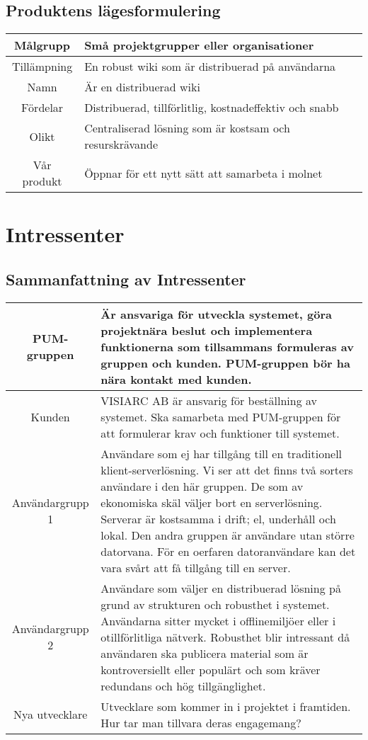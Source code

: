 \subsection{Produktens lägesformulering} %
\begin{tabular}{|c|m{15 cm}|}
\hline
Målgrupp & Små projektgrupper eller organisationer\\
\hline
Tillämpning & En robust wiki som är distribuerad på användarna \\
\hline
Namn & Är en distribuerad wiki  \\
\hline 
Fördelar & Distribuerad, tillförlitlig, kostnadeffektiv och snabb \\
\hline
Olikt & Centraliserad lösning som är kostsam och resurskrävande \\
\hline
Vår produkt & Öppnar för ett nytt sätt att samarbeta i molnet \\
\hline
\end{tabular}
\section{Intressenter}
\subsection{Sammanfattning av Intressenter}
\begin{tabular}{|c|m{14 cm}|}
 \hline
PUM-gruppen & Är ansvariga för utveckla systemet, göra projektnära beslut och implementera funktionerna som tillsammans formuleras av gruppen och kunden.  PUM-gruppen bör ha nära kontakt med kunden. \\ \hline
Kunden & VISIARC AB är ansvarig för beställning av systemet. Ska samarbeta med PUM-gruppen för att formulerar krav och funktioner till systemet. \\ \hline
Användargrupp 1 & Användare som ej har tillgång till en traditionell klient-serverlösning. Vi ser att det finns två sorters användare i den här gruppen. De som av ekonomiska skäl väljer bort en serverlösning. Serverar är kostsamma i drift; el, underhåll och lokal. Den andra gruppen är användare utan större datorvana. För en oerfaren datoranvändare kan det vara svårt att få tillgång till en server. \\ \hline
Användargrupp 2 & Användare som väljer en distribuerad lösning på grund av strukturen och robusthet i systemet. Användarna sitter mycket i offlinemiljöer eller i otillförlitliga nätverk. Robusthet blir intressant då användaren ska publicera material som är kontroversiellt eller populärt och som kräver redundans och hög tillgänglighet.\\ \hline
Nya utvecklare & Utvecklare som kommer in i projektet i framtiden. Hur tar man tillvara deras engagemang?\\ \hline
\end{tabular}

